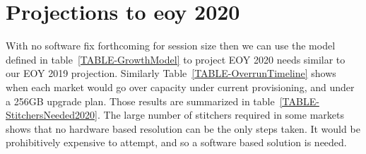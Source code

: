 \documentclass{article}
\begin{document}
\section{Projections to eoy 2020}
\label{SECTION-2020Proj}

With no software fix forthcoming for session size then we can use the model defined in table~\ref{TABLE-GrowthModel} to project EOY 2020 needs similar to our EOY 2019 projection. Similarly Table~\ref{TABLE-OverrunTimeline} shows when each market would go over capacity under current provisioning, and under a 256GB upgrade plan. Those results are summarized in table~\ref{TABLE-StitchersNeeded2020}. The large number of stitchers required in some markets shows that no hardware based resolution can be the only steps taken. It would be prohibitively expensive to attempt, and so a software based solution is needed. 
\end{document}
